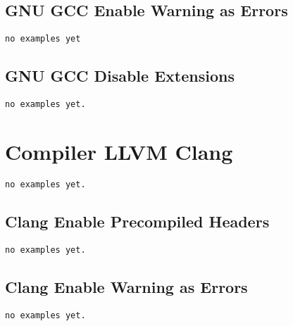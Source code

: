 \subsection{GNU GCC Enable Warning as Errors}

\begin{verbatim}
no examples yet
\end{verbatim}

\subsection{GNU GCC Disable Extensions}

\begin{verbatim}
no examples yet.
\end{verbatim}

\section{Compiler LLVM Clang}

\begin{verbatim}
no examples yet.
\end{verbatim}

\subsection{Clang Enable Precompiled Headers}

\begin{verbatim}
no examples yet.
\end{verbatim}

\subsection{Clang Enable Warning as Errors}

\begin{verbatim}
no examples yet.
\end{verbatim}

